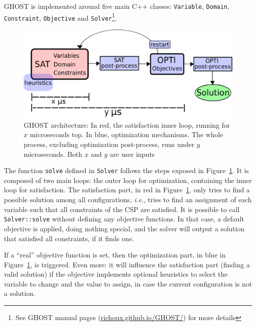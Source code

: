 \documentclass[journal]{IEEEtran}
\newcommand{\minormod}[1]{\color{red} #1\color{black} \xspace}
\newcommand{\csp}{\textsc{CSP}\xspace}
\newcommand{\ghost}{\textsc{GHOST}\xspace}
\newcommand{\ie}{\textit{i.e.}}
\begin{document}
\ghost is implemented around five main C++ classes: \texttt{Variable},
\texttt{Domain},    \texttt{Constraint},     \texttt{Objective}    and
\texttt{Solver}\footnote{See        \ghost         manual        pages
  (\href{http://richoux.github.io/GHOST/}{richoux.github.io/GHOST/})
  for more  details}. %
\begin{figure}[th]
  \centering
  \includegraphics[width=\columnwidth]{figs/archi4.png}
  \caption{\ghost architecture:  In red, the satisfaction  inner loop,
    running  for   $x$  microseconds   top.   In   blue,  optimization
    mechanisms.    The    whole   process,    excluding   optimization
    post-process, runs under $y$ microseconds. \minormod{Both $x$ and $y$ are user inputs}}
  \label{fig:archi}
\end{figure}

The  function \texttt{solve}  defined in  \texttt{Solver} follows  the
steps exposed  in Figure~\ref{fig:archi}. It  is composed of  two main
loops: the outer loop for  optimization, containing the inner loop for
satisfaction.      The     satisfaction     part,    in     red     in
Figure~\ref{fig:archi}, only  tries to find a  possible solution among
all configurations, \ie, tries to  find an assignment of each variable
such that all constraints of the \csp are satisfied. It is possible to
call \texttt{Solver::solve} without  defining any objective functions.
In that case,  a default objective is applied,  doing nothing special,
and the solver will output  a solution that satisfied all constraints,
if it finds one.

If a ``real'' objective function  is set, then the optimization part,
in blue  in Figure~\ref{fig:archi}, is  triggered. Even more:  it will
influence  the satisfaction  part (finding  a valid  solution) if  the
objective  implements optional  heuristics to  select the  variable to
change and the value to assign,  in case the current configuration is not a
solution.
\end{document}
